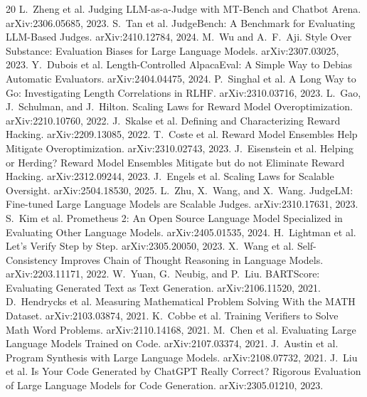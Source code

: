 \documentclass[11pt]{article}
\begin{document}
\begin{thebibliography}{20}
\small
{} L.~Zheng et al. Judging LLM-as-a-Judge with MT-Bench and Chatbot Arena. arXiv:2306.05685, 2023.
 S.~Tan et al. JudgeBench: A Benchmark for Evaluating LLM-Based Judges. arXiv:2410.12784, 2024.
 M.~Wu and A.~F.~Aji. Style Over Substance: Evaluation Biases for Large Language Models. arXiv:2307.03025, 2023.
 Y.~Dubois et al. Length-Controlled AlpacaEval: A Simple Way to Debias Automatic Evaluators. arXiv:2404.04475, 2024.
 P.~Singhal et al. A Long Way to Go: Investigating Length Correlations in RLHF. arXiv:2310.03716, 2023.
 L.~Gao, J.~Schulman, and J.~Hilton. Scaling Laws for Reward Model Overoptimization. arXiv:2210.10760, 2022.
 J.~Skalse et al. Defining and Characterizing Reward Hacking. arXiv:2209.13085, 2022.
 T.~Coste et al. Reward Model Ensembles Help Mitigate Overoptimization. arXiv:2310.02743, 2023.
 J.~Eisenstein et al. Helping or Herding? Reward Model Ensembles Mitigate but do not Eliminate Reward Hacking. arXiv:2312.09244, 2023.
 J.~Engels et al. Scaling Laws for Scalable Oversight. arXiv:2504.18530, 2025.
 L.~Zhu, X.~Wang, and X.~Wang. JudgeLM: Fine-tuned Large Language Models are Scalable Judges. arXiv:2310.17631, 2023.
 S.~Kim et al. Prometheus 2: An Open Source Language Model Specialized in Evaluating Other Language Models. arXiv:2405.01535, 2024.
 H.~Lightman et al. Let's Verify Step by Step. arXiv:2305.20050, 2023.
 X.~Wang et al. Self-Consistency Improves Chain of Thought Reasoning in Language Models. arXiv:2203.11171, 2022.
 W.~Yuan, G.~Neubig, and P.~Liu. BARTScore: Evaluating Generated Text as Text Generation. arXiv:2106.11520, 2021.
 D.~Hendrycks et al. Measuring Mathematical Problem Solving With the MATH Dataset. arXiv:2103.03874, 2021.
 K.~Cobbe et al. Training Verifiers to Solve Math Word Problems. arXiv:2110.14168, 2021.
 M.~Chen et al. Evaluating Large Language Models Trained on Code. arXiv:2107.03374, 2021.
 J.~Austin et al. Program Synthesis with Large Language Models. arXiv:2108.07732, 2021.
 J.~Liu et al. Is Your Code Generated by ChatGPT Really Correct? Rigorous Evaluation of Large Language Models for Code Generation. arXiv:2305.01210, 2023.
\end{thebibliography}
\end{document}
